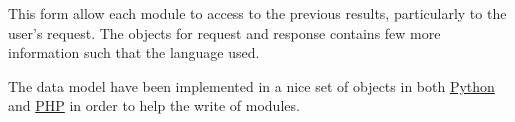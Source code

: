 This form allow each module to access to the previous results, particularly to the user's request. The objects for request and response contains few more information such that the language used.

The data model have been implemented in a nice set of objects in both \href{http://github.com/ProjetPP/PPP-datamodel-Python}{Python} and \href{http://github.com/ProjetPP/PPP-datamodel-PHP}{PHP} in order to help the write of modules.
